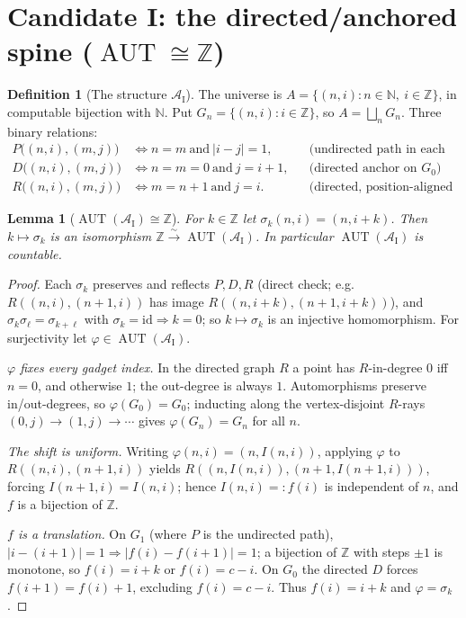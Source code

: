 \documentclass[12pt,fullpage]{article}
\newtheorem{lemma}[theorem]{Lemma}
\theoremstyle{definition}
\newtheorem{definition}[theorem]{Definition}
\newcommand{\A}{\mathcal{A}}
\newcommand{\N}{\mathbb{N}}
\newcommand{\Z}{{\mathbb{Z}}}
\newcommand{\AUT}{\operatorname{AUT}}
\renewcommand{\phi}{\varphi}
\begin{document}
\section{Candidate I: the directed/anchored spine ($\AUT\cong\Z$)}\label{sec:candI}

\begin{definition}[The structure $\A_{\mathrm{I}}$]\label{def:AI}
The universe is $A=\{(n,i):n\in\N,\ i\in\Z\}$, in computable bijection with
$\N$.  Put $G_n=\{(n,i):i\in\Z\}$, so $A=\bigsqcup_n G_n$.  Three binary
relations:
\begin{align*}
P\bigl((n,i),(m,j)\bigr)&\iff n=m\ \text{and}\ |i-j|=1,
&&\text{(undirected path in each gadget)}\\
D\bigl((n,i),(m,j)\bigr)&\iff n=m=0\ \text{and}\ j=i+1,
&&\text{(directed anchor on $G_0$)}\\
R\bigl((n,i),(m,j)\bigr)&\iff m=n+1\ \text{and}\ j=i.
&&\text{(directed, position-aligned spine)}
\end{align*}
\end{definition}

\begin{lemma}[$\AUT(\A_{\mathrm{I}})\cong\Z$]\label{lem:AI-aut}
For $k\in\Z$ let $\sigma_k(n,i)=(n,i+k)$.  Then $k\mapsto\sigma_k$ is an
isomorphism $\Z\xrightarrow{\sim}\AUT(\A_{\mathrm{I}})$.  In particular
$\AUT(\A_{\mathrm{I}})$ is countable.
\end{lemma}

\begin{proof}
Each $\sigma_k$ preserves and reflects $P,D,R$ (direct check; e.g.\
$R((n,i),(n+1,i))$ has image $R((n,i+k),(n+1,i+k))$), and
$\sigma_k\sigma_\ell=\sigma_{k+\ell}$ with $\sigma_k=\mathrm{id}\Rightarrow k=0$;
so $k\mapsto\sigma_k$ is an injective homomorphism.  For surjectivity let
$\phi\in\AUT(\A_{\mathrm{I}})$.

\emph{$\phi$ fixes every gadget index.}  In the directed graph $R$ a point has
$R$-in-degree $0$ iff $n=0$, and otherwise $1$; the out-degree is always $1$.
Automorphisms preserve in/out-degrees, so $\phi(G_0)=G_0$; inducting along the
vertex-disjoint $R$-rays $(0,j)\to(1,j)\to\cdots$ gives $\phi(G_n)=G_n$ for all
$n$.

\emph{The shift is uniform.}  Writing $\phi(n,i)=(n,I(n,i))$, applying $\phi$ to
$R((n,i),(n+1,i))$ yields $R((n,I(n,i)),(n+1,I(n+1,i)))$, forcing
$I(n+1,i)=I(n,i)$; hence $I(n,i)=:f(i)$ is independent of $n$, and $f$ is a
bijection of $\Z$.

\emph{$f$ is a translation.}  On $G_1$ (where $P$ is the undirected path),
$|i-(i+1)|=1\Rightarrow|f(i)-f(i+1)|=1$; a bijection of $\Z$ with steps $\pm1$ is
monotone, so $f(i)=i+k$ or $f(i)=c-i$.  On $G_0$ the directed $D$ forces
$f(i+1)=f(i)+1$, excluding $f(i)=c-i$.  Thus $f(i)=i+k$ and $\phi=\sigma_k$.
\end{proof}
\end{document}

